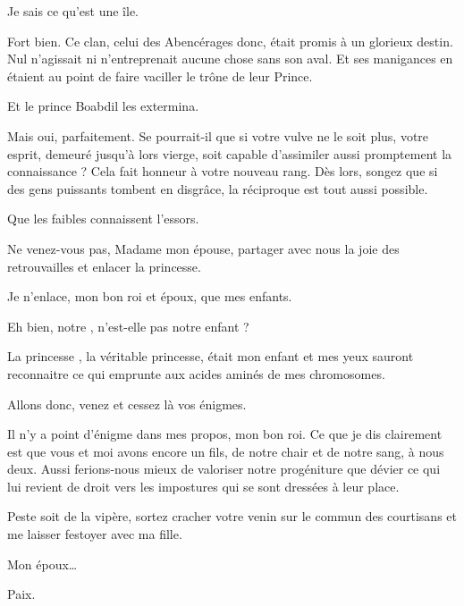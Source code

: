 \begin{drama}
  \elaspeaks {} Je sais ce qu’est une île.

  \elenaspeaks Fort bien.
  Ce clan, celui des Abencérages donc, était promis à un glorieux destin. Nul n’agissait ni n’entreprenait aucune chose sans son aval. Et ses manigances en étaient au point de faire vaciller le trône de leur Prince.

  \elaspeaks Et le prince Boabdil les extermina.

  \elenaspeaks Mais oui, parfaitement.  Se pourrait-il que si votre vulve ne le soit plus, votre esprit, demeuré jusqu’à lors vierge, soit capable d’assimiler aussi promptement la connaissance ? Cela  fait honneur à votre nouveau rang. Dès lors, songez que si des gens puissants tombent en disgrâce, la réciproque est tout aussi possible.


  \elaspeaks Que les faibles connaissent l’essors.

\end{drama}


\scene

\StageDirII{\roi, \reine, \ela}




\begin{drama}
  \roispeaks {} Ne venez-vous pas, Madame mon épouse, partager avec nous la joie des retrouvailles et enlacer la princesse.

  \reinespeaks Je n’enlace, mon bon roi et époux, que mes enfants.

  \roispeaks Eh bien, notre \princesse{}, n’est-elle pas notre enfant ?

  \reinespeaks La princesse \princesse{}, la véritable princesse, était mon enfant et mes yeux sauront reconnaitre ce qui emprunte aux acides aminés de mes chromosomes. %

  \roispeaks{} Allons donc, venez et cessez là vos énigmes.

  \reinespeaks Il n’y a point d’énigme dans mes propos, mon bon roi. Ce que je dis clairement est que vous et moi avons encore un fils, de notre chair et de notre sang, à nous deux. Aussi ferions-nous mieux de valoriser notre progéniture que dévier ce qui lui revient de droit vers les impostures qui se sont dressées à leur place.

  \roispeaks Peste soit de la vipère, sortez cracher votre venin sur le commun des courtisans et me laisser festoyer avec ma fille.

  \reinespeaks Mon époux…

  \roispeaks {} Paix.
\end{drama}


